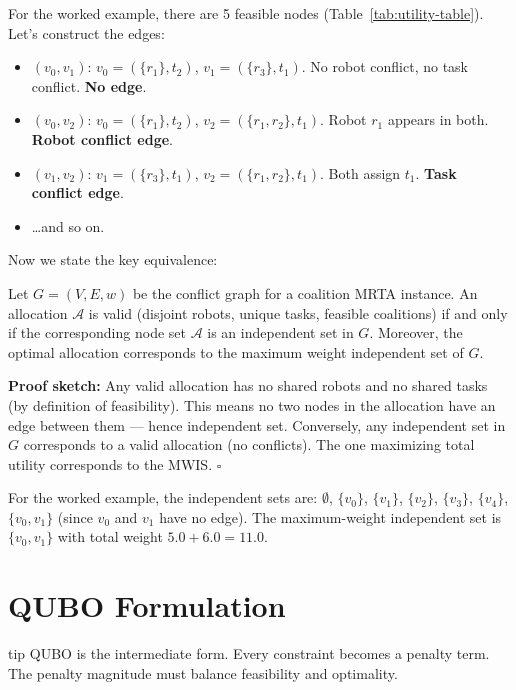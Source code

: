 For the worked example, there are 5 feasible nodes (Table~\ref{tab:utility-table}). Let's construct the edges:
\begin{itemize}
\item $(v_0, v_1)$: $v_0 = (\{r_1\}, t_2)$, $v_1 = (\{r_3\}, t_1)$. No robot conflict, no task conflict. \textbf{No edge}.
\item $(v_0, v_2)$: $v_0 = (\{r_1\}, t_2)$, $v_2 = (\{r_1, r_2\}, t_1)$. Robot $r_1$ appears in both. \textbf{Robot conflict edge}.
\item $(v_1, v_2)$: $v_1 = (\{r_3\}, t_1)$, $v_2 = (\{r_1, r_2\}, t_1)$. Both assign $t_1$. \textbf{Task conflict edge}.
\item \ldots and so on.
\end{itemize}

Now we state the key equivalence:

\begin{lemma}
\label{lem:mrta-mwis}
Let $G = (V, E, w)$ be the conflict graph for a coalition MRTA instance. An allocation $\mathcal{A}$ is valid (disjoint robots, unique tasks, feasible coalitions) if and only if the corresponding node set $\mathcal{A}$ is an independent set in $G$.  Moreover, the optimal allocation corresponds to the maximum weight independent set of $G$.
\end{lemma}

\textbf{Proof sketch:} Any valid allocation has no shared robots and no shared tasks (by definition of feasibility). This means no two nodes in the allocation have an edge between them --- hence independent set. Conversely, any independent set in $G$ corresponds to a valid allocation (no conflicts). The one maximizing total utility corresponds to the MWIS. \hfill $\square$

For the worked example, the independent sets are: $\emptyset$, $\{v_0\}$, $\{v_1\}$, $\{v_2\}$, $\{v_3\}$, $\{v_4\}$, $\{v_0, v_1\}$ (since $v_0$ and $v_1$ have no edge). The maximum-weight independent set is $\{v_0, v_1\}$ with total weight $5.0 + 6.0 = 11.0$.

\section{QUBO Formulation}
\begin{block}{tip}
QUBO is the intermediate form. Every constraint becomes a penalty term. The penalty magnitude must balance feasibility and optimality.
\end{block}

